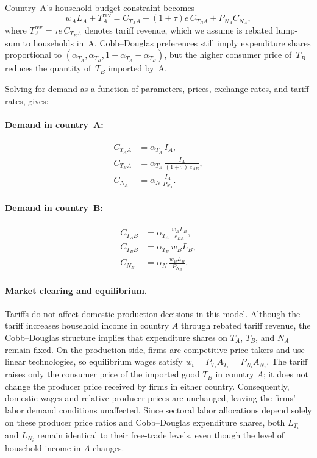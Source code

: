 \documentclass[11pt]{article}
\begin{document}
Country~A's household budget constraint becomes
\begin{equation}
    w_A L_A + T_A^\text{rev}
    = C_{T_A A} + (1+\tau)e\, C_{T_B A} + P_{N_A} C_{N_A},
\end{equation}
where $T_A^\text{rev}=\tau e\, C_{T_B A}$ denotes tariff revenue, which we assume is rebated lump-sum to households in~A. Cobb--Douglas preferences still imply expenditure shares proportional to $(\alpha_{T_A},\alpha_{T_B},1-\alpha_{T_A}-\alpha_{T_B})$, but the higher consumer price of~$T_B$ reduces the quantity of~$T_B$ imported by~A.

Solving for demand as a function of parameters, prices, exchange rates, and tariff rates, gives:
\paragraph{Demand in country~A:}
\begin{align}
C_{T_A A} &= \alpha_{T_A}\, I_A, \\[6pt]
C_{T_B A} &= \alpha_{T_B}\, \frac{I_A}{(1+\tau)\, e_{AB}}, \\[6pt]
C_{N_A}   &= \alpha_N\, \frac{I_A}{P_{N_A}}.
\end{align}

\paragraph{Demand in country~B:}
\begin{align}
C_{T_A B} &= \alpha_{T_A}\, \frac{w_B L_B}{e_{BA}}, \\[6pt]
C_{T_B B} &= \alpha_{T_B}\, w_B L_B, \\[6pt]
C_{N_B}   &= \alpha_N\, \frac{w_B L_B}{P_{N_B}}.
\end{align}


\paragraph{Market clearing and equilibrium.}
Tariffs do not affect domestic production decisions in this model. Although the tariff increases household income in country $A$ through rebated tariff revenue, the Cobb–Douglas structure implies that expenditure shares on $T_A$, $T_B$, and $N_A$ remain fixed. On the production side, firms are competitive price takers and use linear technologies, so equilibrium wages satisfy $w_i = P_{T_i} A_{T_i} = P_{N_i} A_{N_i}$. The tariff raises only the consumer price of the imported good $T_B$ in country $A$; it does not change the producer price received by firms in either country. Consequently, domestic wages and relative producer prices are unchanged, leaving the firms' labor demand conditions unaffected. Since sectoral labor allocations depend solely on these producer price ratios and Cobb–Douglas expenditure shares, both $L_{T_i}$ and $L_{N_i}$ remain identical to their free-trade levels, even though the level of household income in $A$ changes.
\end{document}
